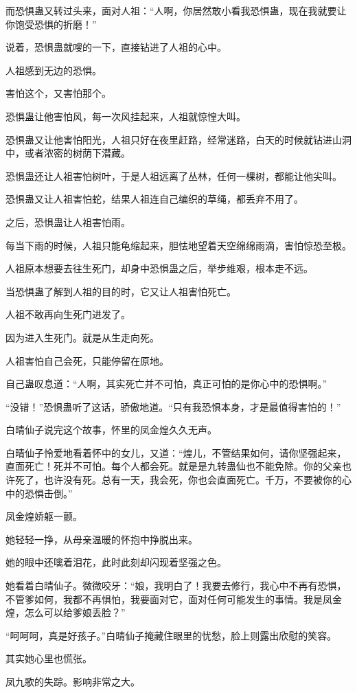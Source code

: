 \begin{this_body}
而恐惧蛊又转过头来，面对人祖：“人啊，你居然敢小看我恐惧蛊，现在我就要让你饱受恐惧的折磨！”

说着，恐惧蛊就嗖的一下，直接钻进了人祖的心中。

人祖感到无边的恐惧。

害怕这个，又害怕那个。

恐惧蛊让他害怕风，每一次风挂起来，人祖就惊惶大叫。

恐惧蛊又让他害怕阳光，人祖只好在夜里赶路，经常迷路，白天的时候就钻进山洞中，或者浓密的树荫下潜藏。

恐惧蛊还让人祖害怕树叶，于是人祖远离了丛林，任何一棵树，都能让他尖叫。

恐惧蛊又让人祖害怕蛇，结果人祖连自己编织的草绳，都丢弃不用了。

之后，恐惧蛊让人祖害怕雨。

每当下雨的时候，人祖只能龟缩起来，胆怯地望着天空绵绵雨滴，害怕惊恐至极。

人祖原本想要去往生死门，却身中恐惧蛊之后，举步维艰，根本走不远。

当恐惧蛊了解到人祖的目的时，它又让人祖害怕死亡。

人祖不敢再向生死门进发了。

因为进入生死门。就是从生走向死。

人祖害怕自己会死，只能停留在原地。

自己蛊叹息道：“人啊，其实死亡并不可怕，真正可怕的是你心中的恐惧啊。”

“没错！”恐惧蛊听了这话，骄傲地道。“只有我恐惧本身，才是最值得害怕的！”

白晴仙子说完这个故事，怀里的凤金煌久久无声。

白晴仙子怜爱地看着怀中的女儿，又道：“煌儿，不管结果如何，请你坚强起来，直面死亡！死并不可怕。每个人都会死。就是是九转蛊仙也不能免除。你的父亲也许死了，也许没有死。总有一天，我会死，你也会直面死亡。千万，不要被你的心中的恐惧击倒。”

凤金煌娇躯一颤。

她轻轻一挣，从母亲温暖的怀抱中挣脱出来。

她的眼中还噙着泪花，此时此刻却闪现着坚强之色。

她看着白晴仙子。微微咬牙：“娘，我明白了！我要去修行，我心中不再有恐惧，不管爹如何，我都不再惧怕，我要面对它，面对任何可能发生的事情。我是凤金煌，怎么可以给爹娘丢脸？”

“呵呵呵，真是好孩子。”白晴仙子掩藏住眼里的忧愁，脸上则露出欣慰的笑容。

其实她心里也慌张。

凤九歌的失踪。影响非常之大。


\end{this_body}

